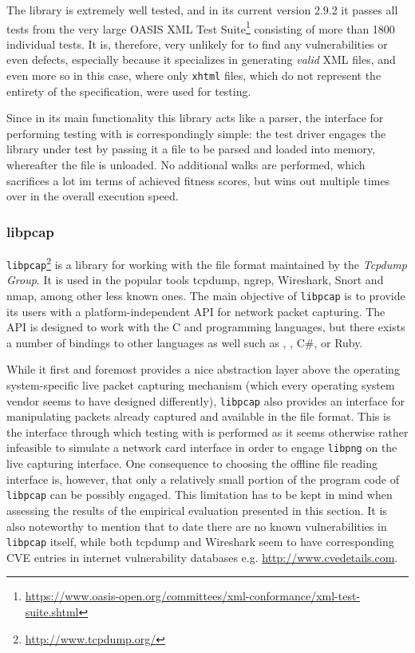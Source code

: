 The library is extremely well tested, and in its current version 2.9.2 it passes all tests from the very large
OASIS XML Test Suite\footnote{\url{https://www.oasis-open.org/committees/xml-conformance/xml-test-suite.shtml}}
consisting of more than 1800 individual tests. It is, therefore, very unlikely for \xmlmate to find any
vulnerabilities or even defects, especially because it specializes in generating \emph{valid} XML files, and
even more so in this case, where only \texttt{xhtml} files, which do not represent the entirety of the \xml
specification, were used for testing.

Since in its main functionality this library acts like a parser, the interface for performing testing with
\xmlmate is correspondingly simple: the test driver engages the library under test by passing it a file to be
parsed and loaded into memory, whereafter the file is unloaded. No additional walks are performed, which
sacrifices a lot im terms of achieved fitness scores, but wins out multiple times over in the
overall execution speed.


\subsubsection{libpcap}
\texttt{libpcap}\footnote{\url{http://www.tcpdump.org/}} is a library for working with the \pcap file format
maintained by the \emph{Tcpdump Group}. It is used in the popular tools tcpdump, ngrep, Wireshark, Snort and
nmap, among other less known ones. The main objective of \texttt{libpcap} is to provide its users with a
platform-independent API for network packet capturing. The API is designed to work with the {\small C} and \cpp
programming languages, but there exists a number of bindings to other languages as well such as \python, \java,
{\small C\#}, or {\small Ruby}.

While it first and foremost provides a nice abstraction layer above the operating system-specific live packet
capturing mechanism (which every operating system vendor seems to have designed differently), \texttt{libpcap}
also provides an interface for manipulating packets already captured and available in the \pcap file format.
This is the interface through which testing with \xmlmate is performed as it seems otherwise rather
infeasible to simulate a network card interface in order to engage \texttt{libpng} on the live capturing
interface. One consequence to choosing the offline  file reading interface is, however, that only a relatively
small portion of the program code of \texttt{libpcap} can be possibly engaged. This limitation has to be kept
in mind when assessing the results of the empirical evaluation presented in this section. It is also noteworthy
to mention that to date there are no known vulnerabilities in \texttt{libpcap} itself, while both tcpdump and
Wireshark seem to have corresponding CVE entries in internet vulnerability databases e.g.
\url{http://www.cvedetails.com}.

